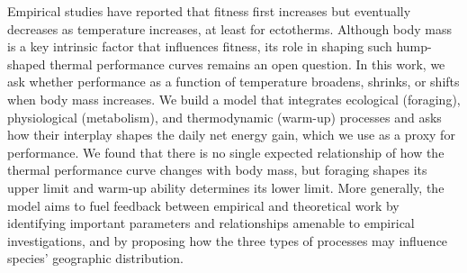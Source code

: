 \noindent
Empirical studies have reported that fitness first increases but eventually decreases as temperature increases, at least for ectotherms.
Although body mass is a key intrinsic factor that influences fitness, its role in shaping such hump-shaped thermal performance curves remains an open question.
In this work, we ask whether performance as a function of temperature broadens, shrinks, or shifts when body mass increases.
We build a model that integrates ecological (foraging), physiological (metabolism), and thermodynamic (warm-up) processes and asks how their interplay shapes the daily net energy gain, which we use as a proxy for performance.
We found that there is no single expected relationship of how the thermal performance curve changes with body mass, but foraging shapes its upper limit and warm-up ability determines its lower limit.
More generally, the model aims to fuel feedback between empirical and theoretical work by identifying important parameters and relationships amenable to empirical investigations, and by proposing how the three types of processes may influence species' geographic distribution.
